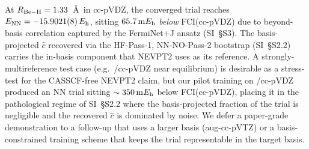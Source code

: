 \documentclass[journal=jctcce,manuscript=article,layout=traditional]{achemso}
\begin{document}
At $R_{\rm Be-H} = 1.33$~\AA\ in cc-pVDZ, the converged trial reaches
$E_{\rm NN} = -15.9021(8)\,E_{\rm h}$, sitting $65.7\,{\rm m}E_{\rm
h}$ \emph{below} FCI(cc-pVDZ) due to beyond-basis correlation
captured by the FermiNet+J ansatz (SI~\S S3).
The basis-projected $\widehat c$ recovered via the HF-Pass-1,
NN-NO-Pass-2 bootstrap (SI~\S S2.2) carries
the in-basis component that NEVPT2 uses as its reference. A
strongly-multireference test case (e.g.\ /cc-pVDZ near
equilibrium) is desirable as a stress-test for the CASSCF-free
NEVPT2 claim, but our pilot training on /cc-pVDZ produced an
NN trial sitting $\sim 350\,{\rm m}E_{\rm h}$ below FCI(cc-pVDZ),
placing it in the pathological regime of
SI~\S S2.2 where the basis-projected fraction
of the trial is negligible and the recovered $\widehat c$ is
dominated by noise. We defer a paper-grade  demonstration to
a follow-up that uses a larger basis (aug-cc-pVTZ) or a
basis-constrained training scheme that keeps the trial
representable in the target basis.
\end{document}
